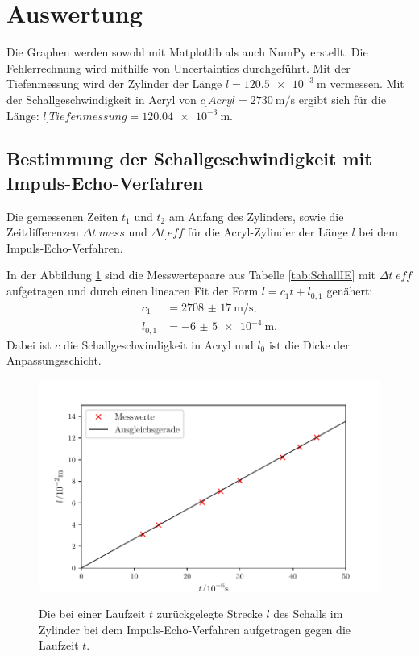 \section{Auswertung}
\label{sec:Auswertung}


Die Graphen werden sowohl mit Matplotlib \cite{matplotlib} als auch NumPy \cite{numpy} erstellt. Die Fehlerrechnung wird mithilfe von Uncertainties \cite{uncertainties} durchgeführt. Mit der Tiefenmessung wird der Zylinder der Länge $l=\SI{120,5e-3}{\metre}$ vermessen. Mit der Schallgeschwindigkeit in Acryl von $c_.{Acryl}=\SI{2730}{\meter\per\second}$ \cite{cAcryl} ergibt sich für die Länge: $l_.{Tiefenmessung}=\SI{120.04e-3}{\metre}$.

\subsection{Bestimmung der Schallgeschwindigkeit mit Impuls-Echo-Verfahren}

\begin{table}
	\centering
	\caption{Die gemessenen Zeiten $t_1$ und $t_2$ am Anfang des Zylinders, sowie die Zeitdifferenzen $\Delta t_.{mess}$ und $\Delta t_.{eff}$ für die Acryl-Zylinder der Länge $l$ bei dem Impuls-Echo-Verfahren.}
	
	\label{tab:SchallIE}
\end{table}

\noindent In der Abbildung \ref{fig:SchallIE} sind die Messwertepaare aus Tabelle \ref{tab:SchallIE} mit $\Delta t_.{eff}$ aufgetragen und durch einen linearen Fit der Form $l=c_1 t + l_{0,1}$ genähert:
\begin{align*}
	c_1&=\SI{2708(17)}{\meter\per\second}\text{,}\\
	l_{0,1}&=\SI{-6(5)e-4}{\meter}\text{.}
\end{align*}
Dabei ist $c$ die Schallgeschwindigkeit in Acryl und $l_0$ ist die Dicke der Anpassungsschicht.

\begin{figure}
	\centering
	\caption{Die bei einer Laufzeit $t$ zurückgelegte Strecke $l$ des Schalls im Zylinder bei dem Impuls-Echo-Verfahren aufgetragen gegen die Laufzeit $t$.}
	\includegraphics[width=\linewidth-70pt,height=\textheight-70pt,keepaspectratio]{content/images/Schallgeschwindigkeit.pdf}
	\label{fig:SchallIE}
\end{figure}

